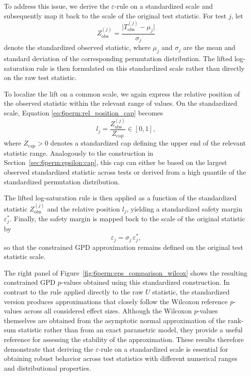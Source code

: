\newpage
To address this issue, we derive the $\varepsilon$-rule on a standardized scale and subsequently map it back to the scale of the original test statistic. 
For test $j$, let
\begin{equation}
Z_{\mathrm{obs}}^{(j)} =
\frac{\lvert T_{\mathrm{obs}}^{(j)} - \mu_j \rvert}{\sigma_j}
\end{equation}
denote the standardized observed statistic, where $\mu_j$ and $\sigma_j$ are the mean and standard deviation of the corresponding permutation distribution. 
The lifted log-saturation rule is then formulated on this standardized scale rather than directly on the raw test statistic.

To localize the lift on a common scale, we again express the relative position of the observed statistic within the relevant range of values. 
On the standardized scale, Equation \eqref{eq:6perm:rel_position_cap} becomes
\begin{equation}
\label{eq:6perm:rel_position_std}
l_j = \frac{Z_{\mathrm{obs}}^{(j)}}{Z_{\mathrm{cap}}} \in [0,1],
\end{equation}
where $Z_{\mathrm{cap}}>0$ denotes a standardized cap defining the upper end of the relevant statistic range. 
Analogously to the construction in Section~\ref{sec:6perm:epsilon:cap}, this cap can either be based on the largest observed standardized statistic across tests or derived from a high quantile of the standardized permutation distribution.

The lifted log-saturation rule is then applied as a function of the standardized statistic $Z_{\mathrm{obs}}^{(j)}$ and the relative position $l_j$, yielding a standardized safety margin $\varepsilon_j^\ast$. 
Finally, the safety margin is mapped back to the scale of the original statistic by
\begin{equation}
\varepsilon_j = \sigma_j \, \varepsilon_j^\ast ,
\end{equation}
so that the constrained GPD approximation remains defined on the original test statistic scale.

The right panel of Figure~\ref{fig:6perm:eps_comparison_wilcox} shows the resulting constrained GPD $p$-values obtained using this standardized construction. 
In contrast to the rule applied directly to the raw $U$ statistic, the standardized version produces approximations that closely follow the Wilcoxon reference $p$-values across all considered effect sizes. 
Although the Wilcoxon $p$-values themselves are obtained from the asymptotic normal approximation of the rank-sum statistic rather than from an exact parametric model, they provide a useful reference for assessing the stability of the approximation. 
These results therefore demonstrate that deriving the $\varepsilon$-rule on a standardized scale is essential for obtaining robust behavior across test statistics with different numerical ranges and distributional properties.

